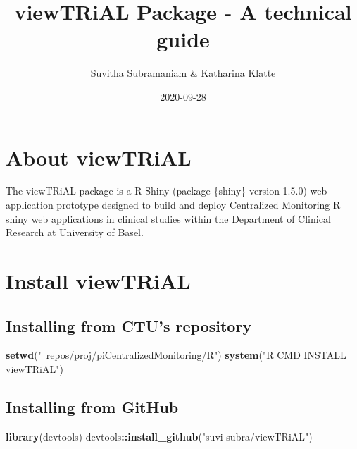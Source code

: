 \documentclass[]{article}
\title{\textbf{viewTRiAL} Package - A technical guide}
\author{Suvitha Subramaniam \& Katharina Klatte}
\date{2020-09-28}
\newenvironment{Shaded}{\begin{snugshade}}{\end{snugshade}}
\newcommand{\KeywordTok}[1]{\textcolor[rgb]{0.13,0.29,0.53}{\textbf{#1}}}
\newcommand{\NormalTok}[1]{#1}
\newcommand{\OperatorTok}[1]{\textcolor[rgb]{0.81,0.36,0.00}{\textbf{#1}}}
\newcommand{\StringTok}[1]{\textcolor[rgb]{0.31,0.60,0.02}{#1}}
\begin{document}
\maketitle

{
\setcounter{tocdepth}{3}
\tableofcontents
}
\newpage

\hypertarget{about-viewtrial}{%
\section{\texorpdfstring{\textbf{About
viewTRiAL}}{About viewTRiAL}}\label{about-viewtrial}}

The viewTRiAL package is a R Shiny (package \{shiny\} version 1.5.0) web
application prototype designed to build and deploy Centralized
Monitoring R shiny web applications in clinical studies within the
Department of Clinical Research at University of Basel.

\hypertarget{install-viewtrial}{%
\section{\texorpdfstring{\textbf{Install
viewTRiAL}}{Install viewTRiAL}}\label{install-viewtrial}}

\hypertarget{installing-from-ctus-repository}{%
\subsection{Installing from CTU's
repository}\label{installing-from-ctus-repository}}

\begin{Shaded}
\begin{Highlighting}[]

\KeywordTok{setwd}\NormalTok{(}\StringTok{"~repos/proj/piCentralizedMonitoring/R"}\NormalTok{)}
\KeywordTok{system}\NormalTok{(}\StringTok{"R CMD INSTALL viewTRiAL"}\NormalTok{)}
\end{Highlighting}
\end{Shaded}

\hypertarget{installing-from-github}{%
\subsection{Installing from GitHub}\label{installing-from-github}}

\begin{Shaded}
\begin{Highlighting}[]

\KeywordTok{library}\NormalTok{(devtools)}
\NormalTok{devtools}\OperatorTok{::}\KeywordTok{install_github}\NormalTok{(}\StringTok{"suvi-subra/viewTRiAL"}\NormalTok{)}
\end{Highlighting}
\end{Shaded}
\end{document}
